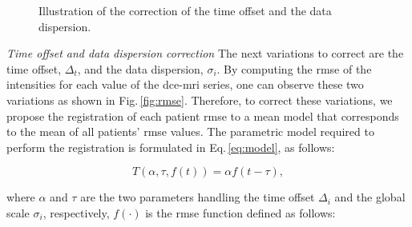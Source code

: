 \documentclass[a4paper,num-refs]{wiley-article}
\begin{document}
\begin{figure}
  \centering
  \hspace*{\fill}
   \hfill
  \hspace*{\fill}
  \caption{Illustration of the correction of the time offset and the data
    dispersion.}
  \label{fig:curveal}
\end{figure}

\emph{Time offset and data dispersion correction} The next variations to
correct are the time offset, $\Delta_t$, and the data dispersion,
$\sigma_i$. By computing the \ac{rmse} of the intensities for each value of the
\ac{dce}-\ac{mri} series, one can observe these two variations as shown in
Fig.\,\ref{fig:rmse}. Therefore, to correct these variations, we propose the
registration of each patient \ac{rmse} to a mean model that corresponds to the
mean of all patients' \ac{rmse} values. The parametric model required to
perform the registration is formulated in Eq.\,\eqref{eq:model}, as follows:

\begin{equation}
  T(\alpha, \tau, f(t)) = \alpha f(t - \tau) ,
  \label{eq:model}
\end{equation}

\noindent where $\alpha$ and $\tau$ are the two parameters handling the time
offset $\Delta_i$ and the global scale $\sigma_i$, respectively, $f(\cdot)$ is
the \ac{rmse} function defined as follows:
\end{document}
